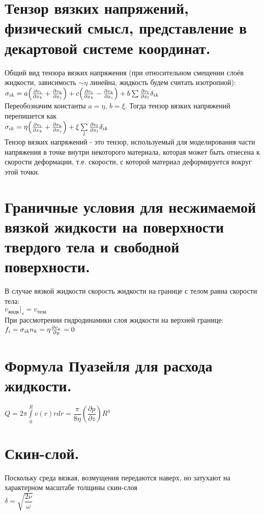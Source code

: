 \begin{multicols*}{2}
		\section{Тензор вязких напряжений, физический смысл, представление в декартовой системе координат.}
		Общий вид тензора вязких напряжения (при относительном смещении слоёв жидкости, зависимость $\sim\eta$ линейна, жидкость будем считать изотропной): \\
		$\sigma_{ik} = a\qty(\pdv{v_i}{x_k}+\pdv{v_k}{x_i})+c\qty(\pdv{v_i}{x_k}-\pdv{v_k}{x_i})+b\sum \pdv{v_l}{x_l} \delta_{ik}$ \\
		Переобозначим константы $a=\eta$, $b=\xi$. Тогда тензор вязких напряжений перепишется как\\
		$ \sigma_{ik} = \eta \qty(\pdv{v_i}{x_k}+\pdv{v_k}{x_i})+\xi \sum\limits_l \pdv{v_l}{x_l} \delta_{ik} $\\
		Тензор вязких напряжений - это тензор, используемый для моделирования части напряжения в точке внутри некоторого материала, которая может быть отнесена к скорости деформации, т.е. скорости, с которой материал деформируется вокруг этой точки.
		
		\section{Граничные условия для несжимаемой вязкой жидкости на поверхности твердого тела и свободной поверхности.}
		В случае вязкой жидкости скорость жидкости на границе с телом равна скорости тела: \\
		$v_\text{жидк}|_s=v_\text{тела}$\\
		При рассмотрении гидродинамики слоя жидкости на верхней границе: \\
		$ f_i = \sigma_{ik} n_k = \eta\pdv{v_x}{y} = 0 $
		
		\section{Формула Пуазейля для расхода жидкости.}
		$Q=2\pi\int\limits_0^Rv(r)rdr=\dfrac{\pi}{8\eta}\left(\dfrac{\partial p}{\partial z}\right)R^4$
		
		\section{Скин-слой.}
		Поскольку среда вязкая, возмущения передаются наверх, но затухают на характерном масштабе толщины скин-слоя \\
		$\delta=\sqrt{\dfrac{2\nu}{\omega}}$
		

\end{multicols*}
